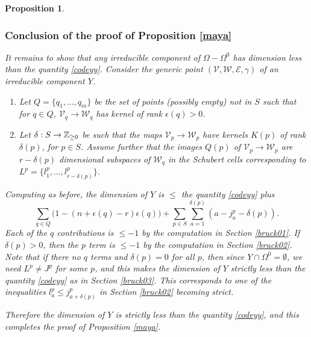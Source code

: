 \documentclass[11pt]{amsart}
\newcommand\me{\mathcal{E}}
\newcommand\mv{\mathcal{V}}
\newcommand\mw{\mathcal{W}}
\newtheorem{proposition}[theorem]{Proposition}
\numberwithin{theorem}{subsection}
\begin{document}
{\begin{proposition}
\subsubsection{Conclusion of the proof of Proposition \ref{maya}}\label{bruck04}
It remains to  show that any irreducible component  of $\Omega-\Omega^0$ has dimension less than the quantity \eqref{codeyy}.  Consider the generic point $(\mv,\mw,\me,\gamma)$ of an irreducible component $Y$.
\begin{enumerate}
\item Let $Q=\{q_1,\dots,q_m\}$ be the set of points (possibly empty) not in $S$ such that for $q\in Q$, $\mv_q\to \mw_q$ has kernel of rank $\epsilon(q)>0$.
\item Let $\delta: S\to \Bbb{Z}_{\geq 0}$ be such that the maps $\mv_p\to\mw_p$ have kernels $K(p)$ of rank $\delta(p)$, for $p\in S$. Assume further that the images $Q(p)$ of $\mv_p\to\mw_p$ are  $r-\delta(p)$ dimensional subspaces of $\mw_q$  in the Schubert cells corresponding to $L^p=\{l^p_1,\dots,l^p_{r-\delta(p)}\}$.
\end{enumerate}
Computing as before, the dimension of  $Y$ is $\leq$ the quantity \eqref{codeyy} plus
$$\sum_{q\in Q} \bigl(1-(n+\epsilon(q)-r)\epsilon(q)\bigr) + \sum_{p\in S} \sum_{a=1}^{\delta(p)} (a-j^p_a-\delta(p)).$$
Each of the $q$ contributions is $\leq -1$ by the computation in Section \ref{bruck01}. If $\delta(p)>0$, then the $p$ term is $\leq -1$ by the computation in Section \ref{bruck02}. Note that if there no $q$ terms and $\delta(p)=0$ for all $p$, then since $Y\cap\Omega^0=\emptyset$, we need $L^p\neq J^p$ for some $p$, and this makes the dimension of $Y$ strictly less than  the quantity \eqref{codeyy} as in Section \ref{bruck03}. This corresponds to one of the inequalities $l^p_a\leq j^p_{a+\delta(p)}$ in Section \ref{bruck02} becoming strict.

Therefore the dimension of $Y$ is strictly less than the quantity \eqref{codeyy}, and this completes the proof of Proposition \ref{maya}.

\end{proposition}}
\end{document}
